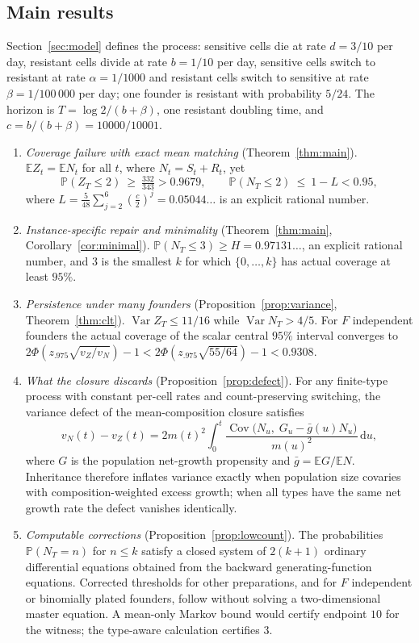 \documentclass[11pt,a4paper]{article}
\theoremstyle{plain}
\theoremstyle{definition}
\theoremstyle{remark}
\newcommand{\PP}{\mathbb P}
\newcommand{\EE}{\mathbb E}
\newcommand{\Var}{\operatorname{Var}}
\newcommand{\Cov}{\operatorname{Cov}}
\newcommand{\dd}{\mathrm d}
\begin{document}
\subsection{Main results}
Section~\ref{sec:model} defines the process: sensitive cells die at rate $d=3/10$ per day, resistant cells divide at rate $b=1/10$ per day, sensitive cells switch to resistant at rate $\alpha=1/1000$ and resistant cells switch to sensitive at rate $\beta=1/100\,000$ per day; one founder is resistant with probability $5/24$. The horizon is $T=\log 2/(b+\beta)$, one resistant doubling time, and $c=b/(b+\beta)=10000/10001$.

\begin{enumerate}[label=(\roman*)]
\item \emph{Coverage failure with exact mean matching} (Theorem~\ref{thm:main}). $\EE Z_t=\EE N_t$ for all $t$, where $N_t=S_t+R_t$, yet
\[
\PP(Z_T\le2)\ \ge\ \tfrac{332}{343}>0.9679,\qquad
\PP(N_T\le2)\ \le\ 1-L<0.95,
\]
where $L=\tfrac5{48}\sum_{j=2}^6(\tfrac c2)^j=0.05044\ldots$ is an explicit rational number.
\item \emph{Instance-specific repair and minimality} (Theorem~\ref{thm:main}, Corollary~\ref{cor:minimal}). $\PP(N_T\le3)\ge H=0.97131\ldots$, an explicit rational number, and $3$ is the smallest $k$ for which $\{0,\dots,k\}$ has actual coverage at least $95\%$.
\item \emph{Persistence under many founders} (Proposition~\ref{prop:variance}, Theorem~\ref{thm:clt}). $\Var Z_T\le 11/16$ while $\Var N_T>4/5$. For $F$ independent founders the actual coverage of the scalar central $95\%$ interval converges to $2\Phi(z_{.975}\sqrt{v_Z/v_N})-1<2\Phi(z_{.975}\sqrt{55/64})-1<0.9308$.
\item \emph{What the closure discards} (Proposition~\ref{prop:defect}). For any finite-type process with constant per-cell rates and count-preserving switching, the variance defect of the mean-composition closure satisfies
\[
v_N(t)-v_Z(t)=2m(t)^2\int_0^t\frac{\Cov\bigl(N_u,\;G_u-\bar g(u)N_u\bigr)}{m(u)^2}\,\dd u ,
\]
where $G$ is the population net-growth propensity and $\bar g=\EE G/\EE N$. Inheritance therefore inflates variance exactly when population size covaries with composition-weighted excess growth; when all types have the same net growth rate the defect vanishes identically.
\item \emph{Computable corrections} (Proposition~\ref{prop:lowcount}). The probabilities $\PP(N_T=n)$ for $n\le k$ satisfy a closed system of $2(k+1)$ ordinary differential equations obtained from the backward generating-function equations. Corrected thresholds for other preparations, and for $F$ independent or binomially plated founders, follow without solving a two-dimensional master equation. A mean-only Markov bound would certify endpoint $10$ for the witness; the type-aware calculation certifies $3$.
\end{enumerate}
\end{document}
